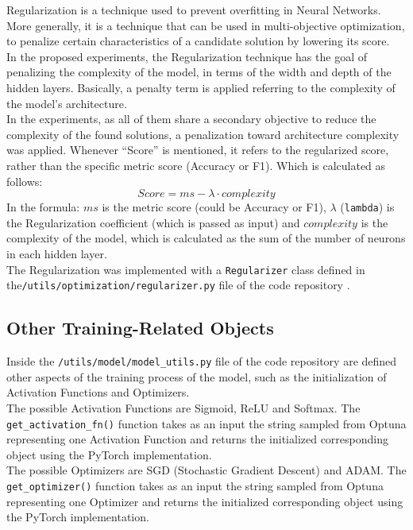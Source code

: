 Regularization is a technique used to prevent overfitting in Neural Networks. More generally, it is a technique that can be used in multi-objective optimization, to penalize certain characteristics of a candidate solution by lowering its score.
\\[0.3cm]In the proposed experiments, the Regularization technique has the goal of penalizing the complexity of the model, in terms of the width and depth of the hidden layers. Basically, a penalty term is applied referring to the complexity of the model's architecture.
\\[0.3cm]In the experiments, as all of them share a secondary objective to reduce the complexity of the found solutions, a penalization toward architecture complexity was applied. Whenever “Score” is mentioned, it refers to the regularized score, rather than the specific metric score (Accuracy or F1). Which is calculated as follows:
\begin{equation}
	Score = ms - \lambda \cdot complexity
\end{equation}
In the formula: $ms$ is the metric score (could be Accuracy or F1), $\lambda$ (\texttt{lambda}) is the Regularization coefficient (which is passed as input) and $complexity$ is the complexity of the model, which is calculated as the sum of the number of neurons in each hidden layer.
\\[0.3cm]The Regularization was implemented with a \texttt{Regularizer} class defined in the\newline\texttt{/utils/optimization/regularizer.py} file of the code repository \cite{Repository-THESIS}.

\subsection{Other Training-Related Objects}

Inside the \texttt{/utils/model/model\_utils.py} file of the code repository \cite{Repository-THESIS} are defined other aspects of the training process of the model, such as the initialization of Activation Functions and Optimizers.
\\[0.3cm]The possible Activation Functions are Sigmoid, ReLU and Softmax. The \newline\texttt{get\_activation\_fn()} function takes as an input the string sampled from Optuna representing one Activation Function and returns the initialized corresponding object using the PyTorch implementation.
\\[0.3cm]The possible Optimizers are SGD (Stochastic Gradient Descent) and ADAM. The \texttt{get\_optimizer()} function takes as an input the string sampled from Optuna representing one Optimizer and returns the initialized corresponding object using the PyTorch implementation.



